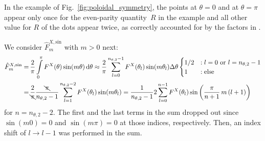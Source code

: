 In the example of Fig.~\ref{fig:poloidal_symmetry}, the points at $\theta=0$ and at $\theta=\pi$ appear only once
for the even-parity quantity~$R$ in the example and all other value for $R$ of the dots appear twice,
as correctly accounted for by the factors in .

We consider $\hat{F}^{X,\mathrm{sin}}_m$ with $m>0$ next:
\begin{align}
 \hat{F}^{X,\mathrm{sin}}_m
  =&\, \frac{2}{\pi} \int\limits_0^{\pi} F^{X}(\theta) \sin(m \theta) \,\mathrm{d}\theta
  \approx \frac{2}{\pi} \sum\limits_{l=0}^{n_{\theta,2}-1} F^{X}(\theta_l) \sin(m \theta_l) \Delta\theta \begin{cases}
                                                                                                           1/2 &: l=0 \textrm{ or } l=n_{\theta,2}-1 \\
                                                                                                           1   &: \textrm{else}
                                                                                                         \end{cases} \nonumber \\
  =&\, \frac{2}{\bcancel{\pi}} \frac{\bcancel{\pi}}{n_{\theta,2}-1} \sum\limits_{l=1}^{n_{\theta,2}-2} F^{X}(\theta_l) \sin(m \theta_l)
  =    \frac{1}{n_{\theta,2}-1} 2 \sum\limits_{l=0}^{n-1} F^{X}(\theta_l) \sin\left(\frac{\pi}{n+1} \,m \,(l+1) \right)
\end{align}
for $n=n_{\theta,2}-2$.
The first and the last terms in the sum dropped out since $\sin(m 0) = 0$ and $\sin(m \pi) = 0$ at those indices, respectively.
Then, an index shift of $l \rightarrow l-1$ was performed in the sum.

